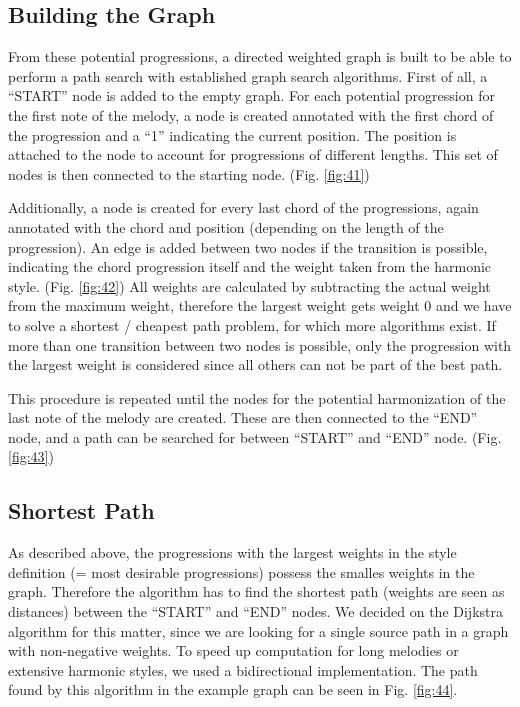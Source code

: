 \subsection{Building the Graph}
From these potential progressions, a directed weighted graph is built to be able to perform a path search with established graph search algorithms. First of all, a ``START'' node is added to the empty graph. For each potential progression for the first note of the melody, a node is created annotated with the first chord of the progression and a ``1'' indicating the current position. The position is attached to the node to account for progressions of different lengths. This set of nodes is then connected to the starting node. (Fig. \ref{fig:41})

Additionally, a node is created for every last chord of the progressions, again annotated with the chord and position (depending on the length of the progression). An edge is added between two nodes if the transition is possible, indicating the chord progression itself and the weight taken from the harmonic style. (Fig. \ref{fig:42}) All weights are calculated by subtracting the actual weight from the maximum weight, therefore the largest weight gets weight 0 and we have to solve a shortest / cheapest path problem, for which more algorithms exist. If more than one transition between two nodes is possible, only the progression with the largest weight is considered since all others can not be part of the best path.

This procedure is repeated until the nodes for the potential harmonization of the last note of the melody are created. These are then connected to the ``END'' node, and a path can be searched for between ``START'' and ``END'' node. (Fig. \ref{fig:43})


\subsection{Shortest Path}
As described above, the progressions with the largest weights in the style definition (= most desirable progressions) possess the smalles weights in the graph. Therefore the algorithm has to find the shortest path (weights are seen as distances) between the ``START'' and ``END'' nodes. We decided on the Dijkstra algorithm for this matter, since we are looking for a single source path in a graph with non-negative weights. To speed up computation for long melodies or extensive harmonic styles, we used a bidirectional implementation. The path found by this algorithm in the example graph can be seen in Fig. \ref{fig:44}.

